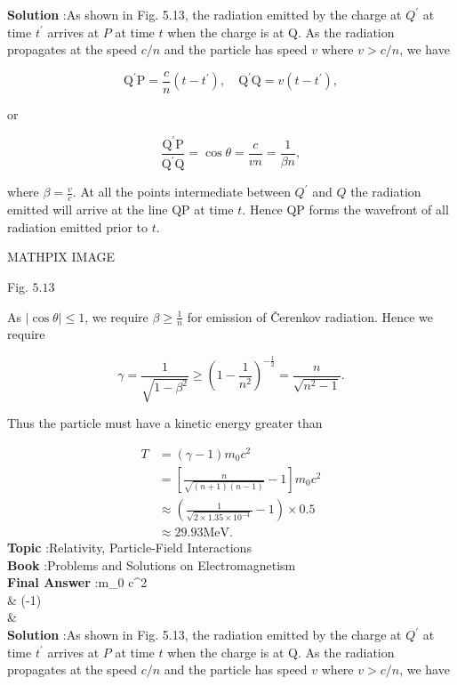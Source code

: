 \documentclass[10pt]{article}
\begin{document}
\textbf{Solution} :As shown in Fig. 5.13, the radiation emitted by the charge at $Q^{\prime}$ at time $t^{\prime}$ arrives at $P$ at time $t$ when the charge is at Q. As the radiation propagates at the speed $c / n$ and the particle has speed $v$ where $v>c / n$, we have

$$
\mathrm{Q}^{\prime} \mathrm{P}=\frac{c}{n}\left(t-t^{\prime}\right), \quad \mathrm{Q}^{\prime} \mathrm{Q}=v\left(t-t^{\prime}\right),
$$

or

$$
\frac{\mathrm{Q}^{\prime} \mathrm{P}}{\mathrm{Q}^{\prime} \mathrm{Q}}=\cos \theta=\frac{c}{v n}=\frac{1}{\beta n},
$$

where $\beta=\frac{v}{c}$. At all the points intermediate between $Q^{\prime}$ and $Q$ the radiation emitted will arrive at the line QP at time $t$. Hence QP forms the wavefront of all radiation emitted prior to $t$.

MATHPIX IMAGE

Fig. $5.13$

 As $|\cos \theta| \leq 1$, we require $\beta \geq \frac{1}{n}$ for emission of Čerenkov radiation. Hence we require

$$
\gamma=\frac{1}{\sqrt{1-\beta^{2}}} \geq\left(1-\frac{1}{n^{2}}\right)^{-\frac{1}{2}}=\frac{n}{\sqrt{n^{2}-1}} .
$$



Thus the particle must have a kinetic energy greater than

$$
\begin{aligned}
T &=(\gamma-1) m_{0} c^{2} \\
&=\left[\frac{n}{\sqrt{(n+1)(n-1)}}-1\right] m_{0} c^{2} \\
& \approx\left(\frac{1}{\sqrt{2 \times 1.35 \times 10^{-4}}}-1\right) \times 0.5 \\
& \approx 29.93 \mathrm{MeV} .
\end{aligned}
$$
\textbf{Topic} :Relativity, Particle-Field Interactions\\
\textbf{Book} :Problems and Solutions on Electromagnetism\\
\textbf{Final Answer} : m_{0} c^{2} \\
& \approx\left(-1\right)  \\
&  \\


\textbf{Solution} :As shown in Fig. 5.13, the radiation emitted by the charge at $Q^{\prime}$ at time $t^{\prime}$ arrives at $P$ at time $t$ when the charge is at Q. As the radiation propagates at the speed $c / n$ and the particle has speed $v$ where $v>c / n$, we have
\end{document}
